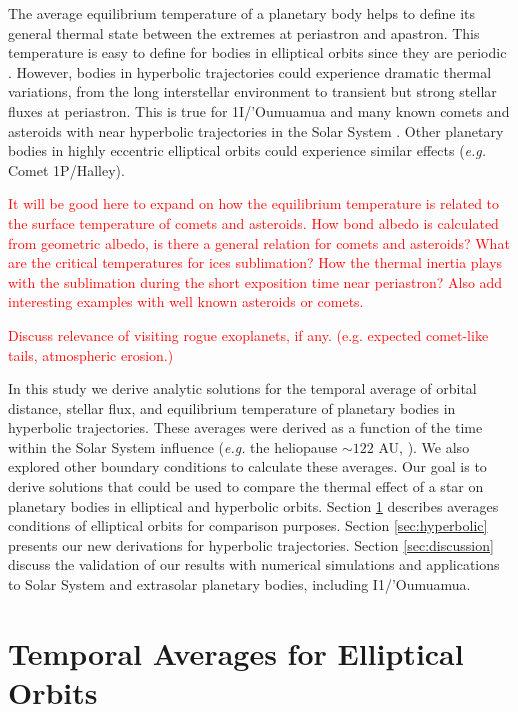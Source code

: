 \documentclass[a4paper,fleqn,usenatbib]{mnras}
\newcommand{\fix}{\textcolor{red}}
\begin{document}
The average equilibrium temperature of a planetary body helps to define its general thermal state between the extremes at periastron and apastron. This temperature is easy to define for bodies in elliptical orbits since they are periodic \citep{2017ApJ...837L...1M}. However, bodies in hyperbolic trajectories could experience dramatic thermal variations, from the long interstellar environment to transient but strong stellar fluxes at periastron. This is true for 1I/'Oumuamua and many known comets and asteroids with near hyperbolic trajectories in the Solar System \citep{SSD(2018)}. Other planetary bodies in highly eccentric elliptical orbits could experience similar effects (\emph{e.g.} Comet 1P/Halley).

\fix{It will be good here to expand on how the equilibrium temperature is related to the surface temperature of comets and asteroids. How bond albedo is calculated from geometric albedo, is there a general relation for comets and asteroids? What are the critical temperatures for ices sublimation? How the thermal inertia plays with the sublimation during the short exposition time near periastron? Also add interesting examples with well known asteroids or comets.}

\fix{Discuss relevance of visiting rogue exoplanets, if any. (e.g. expected comet-like tails, atmospheric erosion.)}  

In this study we derive analytic solutions for the temporal average of orbital distance, stellar flux, and equilibrium temperature of planetary bodies in hyperbolic trajectories. These averages were derived as a function of the time within the Solar System influence (\emph{e.g.} the heliopause $\sim122$ AU, \citet{2017ApJ...834..197C}). We also explored other boundary conditions to calculate these averages. Our goal is to derive solutions that could be used to compare the thermal effect of a star on planetary bodies in elliptical and hyperbolic orbits. Section \ref{sec:elliptical} describes averages conditions of elliptical orbits for comparison purposes. Section \ref{sec:hyperbolic} presents our new derivations for hyperbolic trajectories. Section \ref{sec:discussion} discuss the validation of our results with numerical simulations and applications to Solar System and extrasolar planetary bodies, including I1/'Oumuamua.


\section{Temporal Averages for Elliptical Orbits} \label{sec:elliptical}
\end{document}
